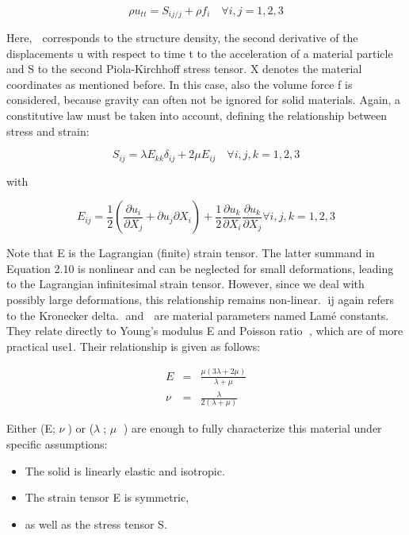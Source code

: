 \begin{equation}
	\rho u_{tt} = S_{ij/j} + \rho f_i \quad \forall i,j = 1,2,3
\end{equation}

Here,  corresponds to the structure density, the second derivative of the displacements u with respect
to time t to the acceleration of a material particle and S to the second Piola-Kirchhoff stress tensor. X
denotes the material coordinates as mentioned before. In this case, also the volume force f is considered,
because gravity can often not be ignored for solid materials. Again, a constitutive law must be taken into
account, defining the relationship between stress and strain:

\begin{equation}
	S_{ij} = \lambda E_{kk} \delta_{ij} + 2\mu E_{ij} \quad \forall i,j,k = 1,2,3
\end{equation}

with

\begin{equation}
	E_{ij} = \frac{1}{2}\left(\frac{\partial u_i}{\partial X_j}   + {\partial u_j}{\partial X_i} \right) + \frac{1}{2} \frac{\partial u_k}{\partial X_i}\frac{\partial u_k}{\partial X_j} \forall i,j,k = 1,2,3
\end{equation}

Note that E is the Lagrangian (finite) strain tensor. The latter summand in Equation 2.10 is nonlinear
and can be neglected for small deformations, leading to the Lagrangian infinitesimal strain tensor.
However, since we deal with possibly large deformations, this relationship remains non-linear. ij again
refers to the Kronecker delta.  and  are material parameters named Lamé constants. They relate
directly to Young’s modulus E and Poisson ratio , which are of more practical use1. Their relationship
is given as follows:

\begin{eqnarray}
	E &=& \frac{\mu(3\lambda+2\mu)}{\lambda + \mu} \\
	\nu &=& \frac{\lambda}{2(\lambda + \mu)}
\end{eqnarray}


Either (E; $\nu$) or ($\lambda$; $\mu$ ) are enough to fully characterize this material under specific assumptions:

\begin{itemize}
	\item The solid is linearly elastic and isotropic. 
	\item The strain tensor E is symmetric,
	\item as well as the stress tensor S. 
\end{itemize}

